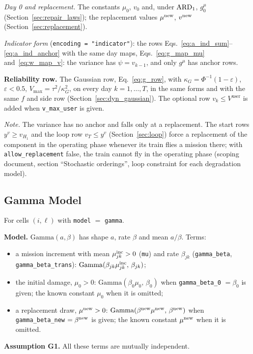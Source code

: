 \emph{Day 0 and replacement.} The constants $\mu_0$, $v_0$ and, under $\mathrm{ARD}_{1}$,
$g^{\mu}_0$ (Section~\ref{sec:repair_laws}); the replacement values $\mu^{\mathrm{new}}$,
$v^{\mathrm{new}}$ (Section~\ref{sec:replacement}).

\emph{Indicator form} (\texttt{encoding = "indicator"}): the rows
Eqs.~\eqref{eq:a_ind_sum}--\eqref{eq:a_ind_anchor} with the same day maps,
Eqs.~\eqref{eq:g_map_mu} and~\eqref{eq:w_map_v}: the variance has
$\psi = v_{k-1}$, and only $g^{\mu}$ has anchor rows.

\textbf{Reliability row.} The Gaussian row, Eq.~\eqref{eq:g_row}, with
$\kappa_G = \Phi^{-1}(1-\varepsilon)$, $\varepsilon < 0.5$,
$V_{\max} = \tau^2/\kappa_G^2$, on every day $k = 1, \ldots, T$, in the same forms
and with the same $f$ and side row (Section~\ref{sec:dyn_gaussian}). The optional
row $v_k \leq V^{\mathrm{user}}$ is added when \texttt{v\_max\_user} is given.

\emph{Note.} The variance has no anchor and falls only at a replacement. The start rows
$y^v \geq v_{H_1}$ and the loop row $v_T \leq y^v$ (Section~\ref{sec:loop}) force a replacement of the component
in the operating phase whenever its train flies a mission there; with
\texttt{allow\_replacement} false, the train cannot fly in the operating phase
(scoping document, section ``Stochastic orderings'', loop constraint for each
degradation model).

\subsection{Gamma Model}
\label{sec:dyn_gamma}

For cells $(i,\ell)$ with \texttt{model} $=$ \texttt{gamma}.

\textbf{Model.} $\mathrm{Gamma}(a, \beta)$ has shape $a$, rate $\beta$ and mean
$a/\beta$. Terms:
\begin{itemize}[leftmargin=1.5em, nosep]
  \item a mission increment with mean $\mu^{\mathrm{inc}}_{jk} > 0$ (\texttt{mu}) and rate
        $\beta_{jk}$ (\texttt{gamma\_beta}, \texttt{gamma\_beta\_trans}):
        $\mathrm{Gamma}(\beta_{jk}\mu^{\mathrm{inc}}_{jk},\, \beta_{jk})$;
  \item the initial damage, $\mu_0 > 0$: $\mathrm{Gamma}(\beta_0\mu_0,\, \beta_0)$
        when \texttt{gamma\_beta\_0} $= \beta_0$ is given; the known constant
        $\mu_0$ when it is omitted;
  \item a replacement draw, $\mu^{\mathrm{new}} > 0$:
        $\mathrm{Gamma}(\beta^{\mathrm{new}}\mu^{\mathrm{new}},\, \beta^{\mathrm{new}})$ when
        \texttt{gamma\_beta\_new} $= \beta^{\mathrm{new}}$ is given; the known constant
        $\mu^{\mathrm{new}}$ when it is omitted.
\end{itemize}
\textbf{Assumption G1.} All these terms are mutually independent.


